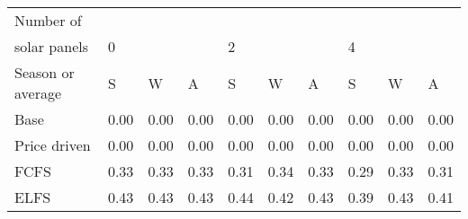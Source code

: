 \begin{table}[h] 
\centering 
\begin{tabular}{l|lll|lll|lll}Number of \\ solar panels&0& & &2& & &4& & \\ \hline 
Season or average & S & W & A & S & W & A & S & W & A \\ \hline 
Base&0.00&0.00&0.00&0.00&0.00&0.00&0.00&0.00&0.00 \\ 
Price driven&0.00&0.00&0.00&0.00&0.00&0.00&0.00&0.00&0.00 \\ 
FCFS&0.33&0.33&0.33&0.31&0.34&0.33&0.29&0.33&0.31 \\ 
ELFS&0.43&0.43&0.43&0.44&0.42&0.43&0.39&0.43&0.41 \\ 
\end{tabular} 
\end{table}